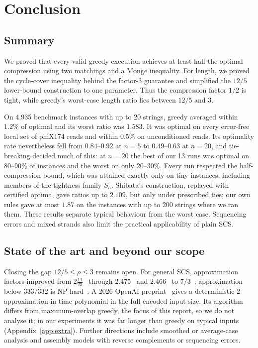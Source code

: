 \documentclass[11pt,a4paper]{article}   %
\theoremstyle{compact}
\theoremstyle{compactdef}
\begin{document}
\section{Conclusion}\label{sec:conclusion}

\subsection{Summary}
We proved that every valid greedy execution achieves at least half the
optimal compression using two matchings and a Monge inequality. For length,
we proved the cycle-cover inequality behind the factor-$3$ guarantee and
simplified the $12/5$ lower-bound construction to one parameter. Thus the
compression factor $1/2$ is tight, while greedy's worst-case length ratio
lies between $12/5$ and $3$.

On 4{,}935 benchmark instances with up to 20 strings, greedy averaged
within $1.2\%$ of optimal and its worst ratio was $1.583$. It was optimal on
every error-free local set of phiX174 reads and within $0.5\%$ on
unconditioned reads. Its optimality rate nevertheless fell from
$0.84$--$0.92$ at $n=5$ to $0.49$--$0.63$ at $n=20$, and tie-breaking
decided much of this: at $n=20$ the best of our 13 runs was optimal on
80--90\% of instances and the worst on only 20--30\%. Every run respected
the half-compression bound, which was attained exactly only on tiny
instances, including members of the tightness family $S_h$. Shibata's
construction, replayed with certified optima, gave ratios up to $2.109$, but
only under prescribed ties; our own rules gave at most $1.87$ on the
instances with up to 200 strings where we ran them. These results separate
typical behaviour from the worst case. Sequencing errors and mixed strands
also limit the practical applicability of plain SCS.

\subsection{State of the art and beyond our scope}
Closing the gap $12/5\le\rho\le3$ remains open. For general SCS,
approximation factors improved from $2\frac{11}{23}$~\cite{Muc13} through
$2.475$~\cite{EMV22} and $2.466$~\cite{EMV23} to $7/3$~\cite{CKMS26};
approximation below $333/332$ is NP-hard~\cite{KS13}.
A 2026 OpenAI preprint~\cite{OAI26} gives a deterministic $2$-approximation
in time polynomial in the full encoded input size. Its algorithm differs
from maximum-overlap greedy, the focus of this report, so we do not analyse
it; in our experiments it was far longer than greedy on typical inputs
(Appendix~\ref{app:extra}). Further directions include
smoothed or average-case analysis and assembly models with reverse
complements or sequencing errors.
\end{document}
